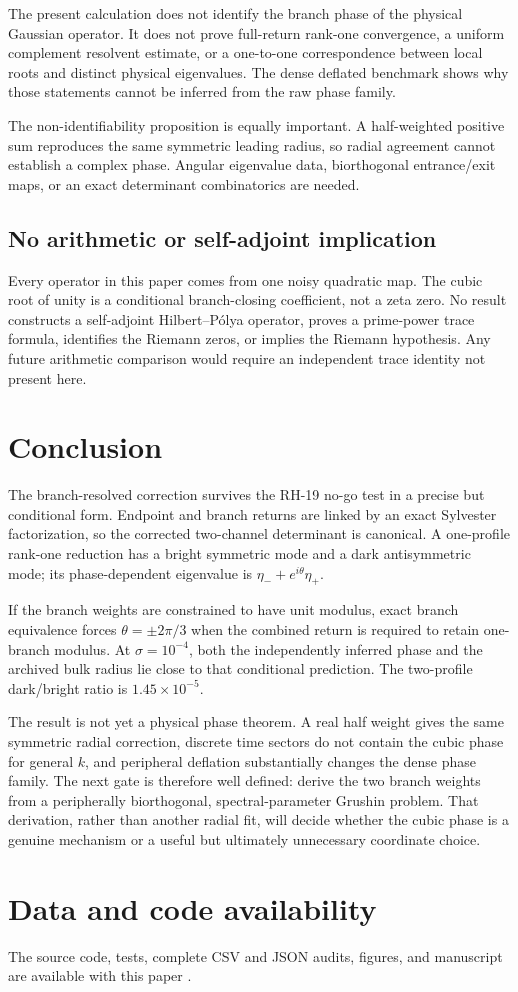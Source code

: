 \documentclass[11pt]{article}
\theoremstyle{definition}
\theoremstyle{remark}
\begin{document}
The present calculation does not identify the branch phase of the physical
Gaussian operator.  It does not prove full-return rank-one convergence, a
uniform complement resolvent estimate, or a one-to-one correspondence
between local roots and distinct physical eigenvalues.  The dense deflated
benchmark shows why those statements cannot be inferred from the raw phase
family.

The non-identifiability proposition is equally important.  A half-weighted
positive sum reproduces the same symmetric leading radius, so radial
agreement cannot establish a complex phase.  Angular eigenvalue data,
biorthogonal entrance/exit maps, or an exact determinant combinatorics are
needed.

\subsection{No arithmetic or self-adjoint implication}

Every operator in this paper comes from one noisy quadratic map.  The cubic
root of unity is a conditional branch-closing coefficient, not a zeta zero.
No result constructs a self-adjoint Hilbert--P\'olya operator, proves a
prime-power trace formula, identifies the Riemann zeros, or implies the
Riemann hypothesis.  Any future arithmetic comparison would require an
independent trace identity not present here.

\section{Conclusion}

The branch-resolved correction survives the RH-19 no-go test in a precise
but conditional form.  Endpoint and branch returns are linked by an exact
Sylvester factorization, so the corrected two-channel determinant is
canonical.  A one-profile rank-one reduction has a bright symmetric mode
and a dark antisymmetric mode; its phase-dependent eigenvalue is
$\eta_-+e^{i\theta}\eta_+$.

If the branch weights are constrained to have unit modulus, exact branch
equivalence forces $\theta=\pm2\pi/3$ when the combined return is required to
retain one-branch modulus.  At $\sigma=10^{-4}$, both the independently
inferred phase and the archived bulk radius lie close to that conditional
prediction.  The two-profile dark/bright ratio is $1.45\times10^{-5}$.

The result is not yet a physical phase theorem.  A real half weight gives
the same symmetric radial correction, discrete time sectors do not contain
the cubic phase for general $k$, and peripheral deflation substantially
changes the dense phase family.  The next gate is therefore well defined:
derive the two branch weights from a peripherally biorthogonal,
spectral-parameter Grushin problem.  That derivation, rather than another
radial fit, will decide whether the cubic phase is a genuine mechanism or a
useful but ultimately unnecessary coordinate choice.

\section*{Data and code availability}

The source code, tests, complete CSV and JSON audits, figures, and manuscript
are available with this paper \citep{WangSectorBranchCode2026}.



\end{document}
